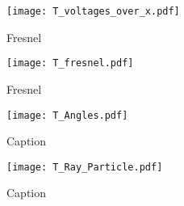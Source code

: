 \lipsum[1-5]

\begin{figure}[htp]
  \centering
  \texttt{[image: T\_voltages\_over\_x.pdf]}
  \caption{Fresnel}
  \label{fig:T_voltages_over_x}
\end{figure}

\lipsum[1-5]

\begin{figure}[htp]
  \centering
  \texttt{[image: T\_fresnel.pdf]}
  \caption{Fresnel}
  \label{fig:T_fresnel}
\end{figure}

\lipsum[1-5]

\begin{figure}[htp]
  \centering
  \texttt{[image: T\_Angles.pdf]}
  \caption{Caption}
  \label{fig:T_angles}
\end{figure}

\lipsum[1-5]

\begin{figure}[htp]
  \centering
  \texttt{[image: T\_Ray\_Particle.pdf]}
  \caption{Caption}
  \label{fig:T_ray_particle}
\end{figure}
